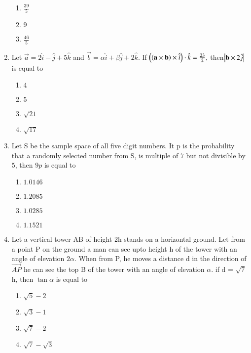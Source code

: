 \documentclass[journal,12pt,twocolumn]{IEEEtran}
\theoremstyle{remark}
\begin{document}
\begin{enumerate}[start=1]
\begin{enumerate}
    \item $\frac{39}{5}$
    \item $9$
    \item $\frac{46}{5}$
\end{enumerate}
\item Let $\vec{a} = 2\hat{i}-\hat{j}+5\hat{k}$ and $ \vec{b} = \alpha \hat{i} + \beta \hat{j}+2\hat{k}.$ If $\left(\left(\mathbf{a}\times \mathbf{b}\right) \times \hat{i}\right)\cdot \hat{k}=\frac{23}{2},$ then$ \left\vert\mathbf{b}\times 2\hat{j}\right\vert$ is equal to
\begin{enumerate}
    \item $4$
    \item $5$
    \item $\sqrt{21}$
    \item $\sqrt{17}$
\end{enumerate}
\item Let S be the sample space of all five digit numbers. It p is the probability that a randomly selected number from S, is multiple of $7$ but not divisible by $5$, then $9p$ is equal to
\begin{enumerate}
    \item $1.0146$
    \item $1.2085$
    \item $1.0285$
    \item $1.1521$
\end{enumerate}
\item  Let a vertical tower AB of height 2h stands on a horizontal ground. Let from a point P on the ground a man can see upto height h of the tower with an angle of elevation $2\alpha$. When from P, he moves a distance d in the direction of $ \overrightarrow{AP}$ he can see the top B of the tower with an angle of elevation $\alpha$.  if d = $\sqrt{7}$ h, then $\tan \alpha$ is equal to
\begin{enumerate}
    \item $ \sqrt{5}-2$
    \item $ \sqrt{3}-1$
    \item $ \sqrt{7}-2$
    \item $ \sqrt{7}-\sqrt{3}$
\end{enumerate}
\end{enumerate}
\end{document}
